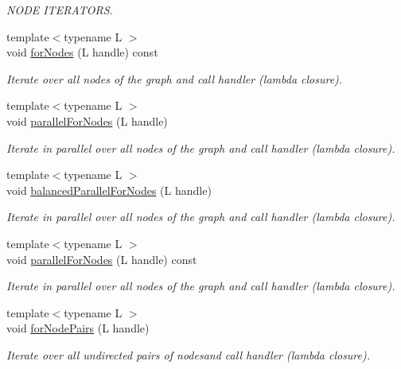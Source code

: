 \begin{DoxyCompactItemize}
\begin{DoxyCompactList}\small\item\em N\-O\-D\-E I\-T\-E\-R\-A\-T\-O\-R\-S. \end{DoxyCompactList}\item 
{\footnotesize template$<$typename L $>$ }\\void \hyperlink{class_ensemble_clustering_1_1_graph_a3fd319d26d83cb8fa277999e6de0f28e}{for\-Nodes} (L handle) const 
\begin{DoxyCompactList}\small\item\em Iterate over all nodes of the graph and call handler (lambda closure). \end{DoxyCompactList}\item 
{\footnotesize template$<$typename L $>$ }\\void \hyperlink{class_ensemble_clustering_1_1_graph_a80dc95eb3a526de34c6a35ccc1dfc7ef}{parallel\-For\-Nodes} (L handle)
\begin{DoxyCompactList}\small\item\em Iterate in parallel over all nodes of the graph and call handler (lambda closure). \end{DoxyCompactList}\item 
{\footnotesize template$<$typename L $>$ }\\void \hyperlink{class_ensemble_clustering_1_1_graph_a60d5c6118c8060050a032d15f215bb67}{balanced\-Parallel\-For\-Nodes} (L handle)
\begin{DoxyCompactList}\small\item\em Iterate in parallel over all nodes of the graph and call handler (lambda closure). \end{DoxyCompactList}\item 
{\footnotesize template$<$typename L $>$ }\\void \hyperlink{class_ensemble_clustering_1_1_graph_a516007688beba11862e1405b236f0224}{parallel\-For\-Nodes} (L handle) const 
\begin{DoxyCompactList}\small\item\em Iterate in parallel over all nodes of the graph and call handler (lambda closure). \end{DoxyCompactList}\item 
{\footnotesize template$<$typename L $>$ }\\void \hyperlink{class_ensemble_clustering_1_1_graph_a5c422bd0b1f00f8c40686991f94bcdaa}{for\-Node\-Pairs} (L handle)
\begin{DoxyCompactList}\small\item\em Iterate over all undirected pairs of nodesand call handler (lambda closure). \end{DoxyCompactList}\item 

\end{DoxyCompactItemize}

